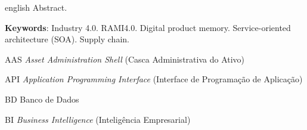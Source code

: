 \begin{resumo}[Abstract]
	\begin{otherlanguage*}{english}
		Abstract.
		
		\vspace{\onelineskip}

		\noindent 
		\textbf{Keywords}: Industry 4.0. RAMI4.0. Digital product memory. Service-oriented architecture (SOA). Supply chain. 
	\end{otherlanguage*}
\end{resumo}

\listoffigures*
\cleardoublepage

\listoftables*
\cleardoublepage

\begin{siglas}
	\item[AAS] \textit{Asset Administration Shell} (Casca Administrativa do Ativo)
	\item[API] \textit{Application Programming Interface} (Interface de Programação de Aplicação)
	\item[BD] Banco de Dados
	\item[BI] \textit{Business Intelligence} (Inteligência Empresarial)

\end{siglas}

\tableofcontents*
\cleardoublepage
